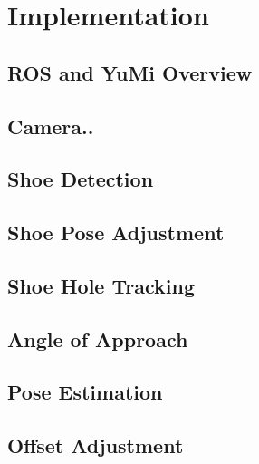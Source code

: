 \chapter{Implementation}

\section{ROS and YuMi Overview}

\section{Camera..}

\section{Shoe Detection}

\section{Shoe Pose Adjustment}

\section{Shoe Hole Tracking}

\section{Angle of Approach}

\section{Pose Estimation}

\section{Offset Adjustment}

